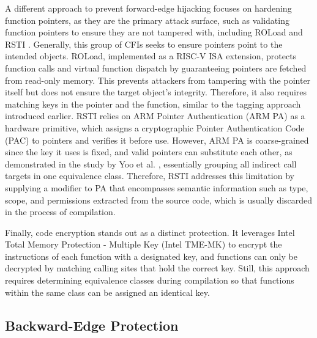 \documentclass[journal,onecolumn]{IEEEtran}
\begin{document}
A different approach to prevent forward-edge hijacking focuses on hardening function pointers, as they are the primary attack surface, such as validating function pointers to ensure they are not tampered with, including ROLoad \cite{Tan22} and RSTI \cite{Ismail24}. Generally, this group of CFIs seeks to ensure pointers point to the intended objects. ROLoad, implemented as a RISC-V ISA extension, protects function calls and virtual function dispatch by guaranteeing pointers are fetched from read-only memory. This prevents attackers from tampering with the pointer itself but does not ensure the target object's integrity. Therefore, it also requires matching keys in the pointer and the function, similar to the tagging approach introduced earlier. RSTI relies on ARM Pointer Authentication (ARM PA)\cite{ARMPA} as a hardware primitive, which assigns a cryptographic Pointer Authentication Code (PAC) to pointers and verifies it before use. However, ARM PA is coarse-grained since the key it uses is fixed, and valid pointers can substitute each other, as demonstrated in the study by Yoo et al. \cite{Yoo22b}, essentially grouping all indirect call targets in one equivalence class. Therefore, RSTI addresses this limitation by supplying a modifier to PA that encompasses semantic information such as type, scope, and permissions extracted from the source code, which is usually discarded in the process of compilation.

Finally, code encryption \cite{Unterguggenberger26} stands out as a distinct protection. It leverages Intel Total Memory Protection - Multiple Key (Intel TME-MK) \cite{IntelTMEMK} to encrypt the instructions of each function with a designated key, and functions can only be decrypted by matching calling sites that hold the correct key. Still, this approach requires determining equivalence classes during compilation so that functions within the same class can be assigned an identical key.

\subsection{Backward-Edge Protection}
\end{document}
